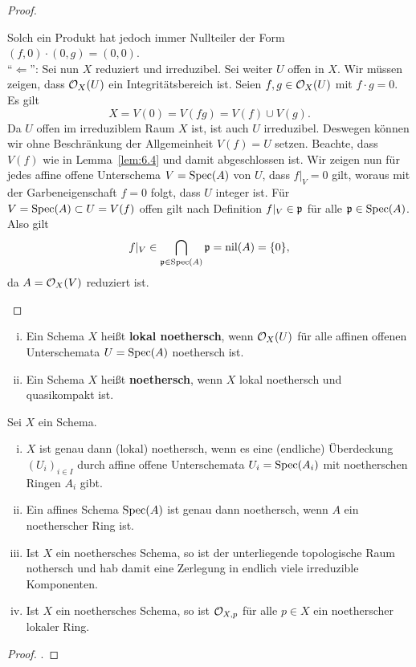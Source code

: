 \begin{prop}
\begin{proof}
\begin{enumerate}[i)]
			Solch ein Produkt hat jedoch immer Nullteiler der Form $(f,0) \cdot (0,g) = (0,0)$.\\
			\enquote{$\Longleftarrow$}: Sei nun $X$ reduziert und irreduzibel. Sei weiter $U$ offen in $X$. Wir müssen zeigen, dass $\mathcal{O}_X(U)$ ein Integritätsbereich ist. Seien $f,g \in \mathcal{O}_X(U)$ mit $f\cdot g = 0$. Es gilt
			\[
				X = V(0) = V(fg) = V(f) \cup V(g).
			\]
			Da $U$ offen im irreduziblem Raum $X$ ist, ist auch $U$ irreduzibel. Deswegen können wir ohne Beschränkung der Allgemeinheit $V(f) = U$ setzen. Beachte, dass $V(f)$ wie in Lemma~\ref{lem:6.4} und damit abgeschlossen ist. Wir zeigen nun für jedes affine offene Unterschema $V=\operatorname{Spec}(A)$ von $U$, dass $f\vert_V = 0$ gilt, woraus mit der Garbeneigenschaft $f=0$ folgt, dass $U$ integer ist. Für $V=\operatorname{Spec}(A) \subset U = V(f)$ offen gilt nach Definition $f\vert_V \in \mathfrak{p}$ für alle $\mathfrak{p} \in \operatorname{Spec}(A)$. Also gilt
			\[
				f\vert_V \in \bigcap_{\mathfrak{p} \in \operatorname{Spec}(A)} \mathfrak{p} = \operatorname{nil}(A) = \{0\},
			\]
			da $A = \mathcal{O}_X(V)$ reduziert ist.
		\end{enumerate}
	\end{proof}
\end{prop}

\begin{defn}
\label{defn:6.6}
	\begin{enumerate}[i)]
		\item Ein Schema $X$ heißt \textbf{lokal noethersch}, wenn $\mathcal{O}_{X}(U)$ für alle affinen offenen Unterschemata $U = \operatorname{Spec}(A)$ noethersch ist.
		\item Ein Schema $X$ heißt \textbf{noethersch}, wenn $X$ lokal noethersch und quasikompakt ist.
	\end{enumerate}
\end{defn}


\begin{prop}
\label{prop:6.7}
	Sei $X$ ein Schema.
	\begin{enumerate}[i)]
		\item $X$ ist genau dann (lokal) noethersch, wenn es eine (endliche) Überdeckung $(U_i)_{i\in I}$ durch affine offene Unterschemata $U_i = \operatorname{Spec}(A_i)$ mit noetherschen Ringen $A_i$ gibt.
		\item Ein affines Schema $\operatorname{Spec}(A)$ ist genau dann noethersch, wenn $A$ ein noetherscher Ring ist.
		\item Ist $X$ ein noethersches Schema, so ist der unterliegende topologische Raum nothersch und hab damit eine Zerlegung in endlich viele irreduzible Komponenten.
		\item Ist $X$ ein noethersches Schema, so ist $\mathcal{O}_{X,p}$ für alle $p \in X$ ein noetherscher lokaler Ring.
	\end{enumerate}
	\begin{proof}
		\cite[Proposition II.3.2]{hartshorne1977algebraic}.
	\end{proof}
\end{prop}

